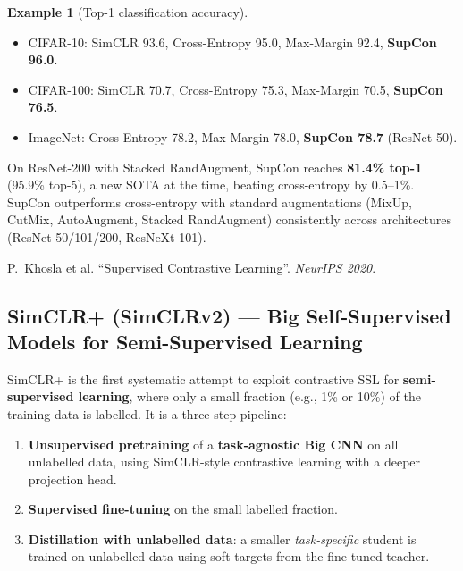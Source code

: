 \documentclass[11pt,a4paper]{article}
\theoremstyle{definition}
\newtheorem{example}{Example}[section]
\theoremstyle{plain}
\theoremstyle{remark}
\begin{document}
\begin{example}[Top-1 classification accuracy]
\begin{itemize}[leftmargin=*]
    \item CIFAR-10: SimCLR 93.6, Cross-Entropy 95.0, Max-Margin 92.4, \textbf{SupCon 96.0}.
    \item CIFAR-100: SimCLR 70.7, Cross-Entropy 75.3, Max-Margin 70.5, \textbf{SupCon 76.5}.
    \item ImageNet: Cross-Entropy 78.2, Max-Margin 78.0, \textbf{SupCon 78.7} (ResNet-50).
\end{itemize}
On ResNet-200 with Stacked RandAugment, SupCon reaches \textbf{81.4\% top-1} (95.9\% top-5), a new SOTA at the time, beating cross-entropy by 0.5--1\%. SupCon outperforms cross-entropy with standard augmentations (MixUp, CutMix, AutoAugment, Stacked RandAugment) consistently across architectures (ResNet-50/101/200, ResNeXt-101).
\end{example}

\begin{tcolorbox}[colback=blue!5!white,colframe=blue!60!black,title={Reference}]
P.\ Khosla et al. ``Supervised Contrastive Learning''. \textit{NeurIPS 2020}.
\end{tcolorbox}

\subsection{SimCLR+ (SimCLRv2) --- Big Self-Supervised Models for Semi-Supervised Learning}

SimCLR+ is the first systematic attempt to exploit contrastive SSL for \textbf{semi-supervised learning}, where only a small fraction (e.g., 1\% or 10\%) of the training data is labelled. It is a three-step pipeline:

\begin{tcolorbox}[colback=green!5!white,colframe=green!60!black,title=\textbf{Pretrain, Fine-tune, Distill}]
\begin{enumerate}
    \item \textbf{Unsupervised pretraining} of a \textbf{task-agnostic Big CNN} on all unlabelled data, using SimCLR-style contrastive learning with a deeper projection head.
    \item \textbf{Supervised fine-tuning} on the small labelled fraction.
    \item \textbf{Distillation with unlabelled data}: a smaller \emph{task-specific} student is trained on unlabelled data using soft targets from the fine-tuned teacher.
\end{enumerate}
\end{tcolorbox}
\end{document}
